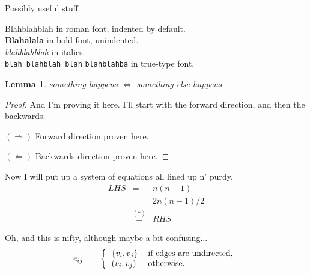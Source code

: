 \documentclass[11pt]{article}
\newtheorem{lemma}{Lemma}
\begin{document}
\noindent Possibly useful stuff.


\noindent Blahblahblah in roman font, indented by default.\\ 

 
\noindent \textbf{Blahalala} in bold font, unindented.\\
 
\noindent \emph{blahblahblah} in italics. \\

\noindent \verb+blah blahblah blah+ \texttt{blahblahba} in true-type font.\\ 

\begin{lemma}
something happens $\iff$ something else happens.
\end{lemma}

\begin{proof}And I'm proving it here. I'll start with the forward direction, and then the backwards.\medskip

\noindent $(\Rightarrow)$ Forward direction proven here.\medskip

\noindent $(\Leftarrow)$ Backwards direction proven here.\end{proof}


Now I will put up a system of equations all lined up n' purdy.
\begin{eqnarray*}
LHS & = & n(n-1) \\
& = & 2n(n-1)/2 \\
& \stackrel{(*)}{=} & RHS
\end{eqnarray*}

Oh, and this is nifty, although maybe a bit confusing...
\begin{eqnarray*}
e_{ij} & = & \left\{ \begin{tabular}{ll} $\{v_i, v_j\}$ & if edges are undirected, \\
						       $(v_i, v_j)$ & otherwise. \end{tabular} \right.
\end{eqnarray*}
\end{document}
